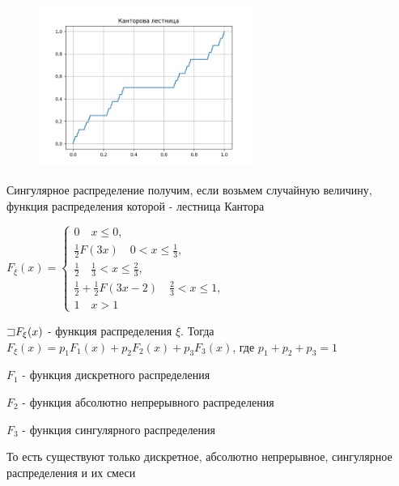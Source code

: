 \documentclass[12pt]{article}
\begin{document}
    \begin{minipage}{\textwidth}
        \begin{figure}
            \includegraphics[width=7cm]{probtheory/images/probtheory_2024_10_22_1}
        \end{figure}







        \Exs Сингулярное распределение получим, если возьмем случайную величину, функция распределения которой - 
        лестница Кантора
    
        $F_\xi(x) = \begin{cases}0 \quad x \leq 0, \\ \frac{1}{2}F(3x) \quad 0 < x \leq \frac{1}{3}, \\ \frac{1}{2} \quad \frac{1}{3} < x \leq \frac{2}{3}, \\ \frac{1}{2} + \frac{1}{2}F(3x - 2) \quad \frac{2}{3} < x \leq 1, \\ 1 \quad x > 1\end{cases}$
    \end{minipage}

    \begin{MyTheorem}

        $\mathord{\sqsupset} F_\xi(x)$ - функция распределения $\xi$. Тогда $F_\xi(x) = p_1 F_1(x) + p_2 F_2(x) + p_3 F_3(x)$, где $p_1 + p_2 + p_3 = 1$

        $F_1$ - функция дискретного распределения

        $F_2$ - функция абсолютно непрерывного распределения

        $F_3$ - функция сингулярного распределения

        То есть существуют только дискретное, абсолютно непрерывное, сингулярное распределения и их смеси
    \end{MyTheorem}
\end{document}
